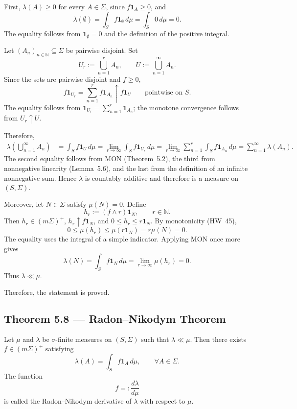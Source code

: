 \par\noindent{}\par\nobreak

First, $\lambda(A)\ge0$ for every $A\in\Sigma$, since $f\mathbf1_A\ge0$, and
\[
\lambda(\emptyset)=\int_S f\mathbf1_{\emptyset}\,d\mu
=\int_S0\,d\mu=0.
\]
The equality follows from $\mathbf1_{\emptyset}=0$ and the definition of the positive integral.

Let $(A_n)_{n\in\mathbb N}\subseteq\Sigma$ be pairwise disjoint. Set
\[
U_r:=\bigcup_{n=1}^{r}A_n,
\qquad U:=\bigcup_{n=1}^{\infty}A_n.
\]
Since the sets are pairwise disjoint and $f\ge0$,
\[
f\mathbf1_{U_r}=\sum_{n=1}^{r}f\mathbf1_{A_n}
\uparrow f\mathbf1_U\qquad\text{pointwise on }S.
\]
The equality follows from $\mathbf1_{U_r}=\sum_{n=1}^{r}\mathbf1_{A_n}$; the monotone convergence follows from $U_r\uparrow U$.

Therefore,
\[
\begin{aligned}
\lambda\left(\bigcup_{n=1}^{\infty}A_n\right)&=\int_S f\mathbf1_U\,d\mu =\lim_{r\to\infty}\int_S f\mathbf1_{U_r}\,d\mu =\lim_{r\to\infty}\sum_{n=1}^{r}\int_S f\mathbf1_{A_n}\,d\mu =\sum_{n=1}^{\infty}\lambda(A_n).
\end{aligned}
\]
The second equality follows from MON (Theorem~5.2), the third from nonnegative linearity (Lemma~5.6), and the last from the definition of an infinite nonnegative sum. Hence $\lambda$ is countably additive and therefore is a measure on $(S,\Sigma)$.

Moreover, let $N\in\Sigma$ satisfy $\mu(N)=0$. Define
\[
h_r:=(f\wedge r)\mathbf1_N,\qquad r\in\mathbb N.
\]
Then $h_r\in(m\Sigma)^+$, $h_r\uparrow f\mathbf1_N$, and $0\le h_r\le r\mathbf1_N$. By monotonicity (HW~45),
\[
0\le\mu(h_r)\le\mu(r\mathbf1_N)=r\mu(N)=0.
\]
The equality uses the integral of a simple indicator. Applying MON once more gives
\[
\lambda(N)=\int_S f\mathbf1_N\,d\mu
=\lim_{r\to\infty}\mu(h_r)=0.
\]
Thus $\lambda\ll\mu$.

Therefore, the statement is proved. 

\subsection*{Theorem 5.8 --- Radon--Nikodym Theorem}%
%

 Let $\mu$ and $\lambda$ be $\sigma$-finite measures on $(S,\Sigma)$ such that $\lambda\ll\mu$. Then there exists $f\in(m\Sigma)^+$ satisfying
\[
\lambda(A)=\int_S f\mathbf1_A\,d\mu,
\qquad\forall A\in\Sigma.
\]
The function
\[
f=: \frac{d\lambda}{d\mu}
\]
is called the Radon--Nikodym derivative of $\lambda$ with respect to $\mu$.

